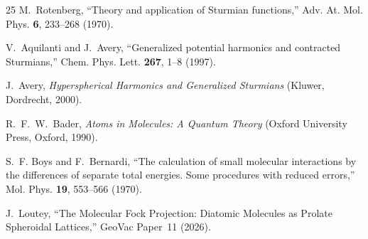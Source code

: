 \documentclass[aps,pra,twocolumn,superscriptaddress,longbibliography]{revtex4-2}
\begin{document}
\begin{thebibliography}{25}
M.~Rotenberg,
``Theory and application of Sturmian functions,''
Adv. At. Mol. Phys. \textbf{6}, 233--268 (1970).

V.~Aquilanti and J.~Avery,
``Generalized potential harmonics and contracted Sturmians,''
Chem. Phys. Lett. \textbf{267}, 1--8 (1997).

J.~Avery,
\textit{Hyperspherical Harmonics and Generalized Sturmians}
(Kluwer, Dordrecht, 2000).

R.~F.~W.~Bader,
\textit{Atoms in Molecules: A Quantum Theory}
(Oxford University Press, Oxford, 1990).

S.~F. Boys and F.~Bernardi,
``The calculation of small molecular interactions by the differences
of separate total energies. Some procedures with reduced errors,''
Mol. Phys. \textbf{19}, 553--566 (1970).

J.~Loutey,
``The Molecular Fock Projection: Diatomic Molecules as Prolate
Spheroidal Lattices,''
GeoVac Paper~11 (2026).

\end{thebibliography}
\end{document}
